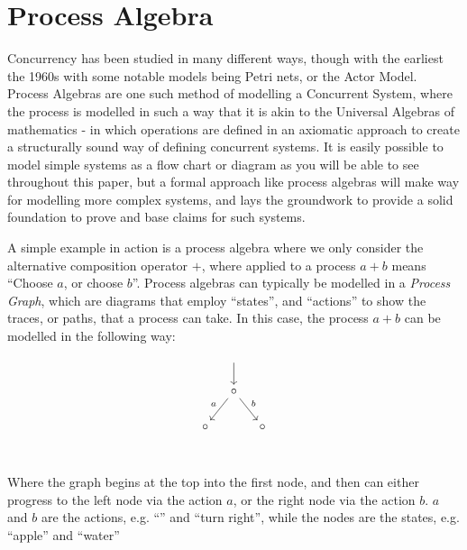 \documentclass[../hons_project.tex]{subfiles}
\begin{document}
\section{Process Algebra}
Concurrency has been studied in many different ways, though with the earliest  the 1960s with some notable models being Petri nets, or the Actor Model. Process Algebras are one such method of modelling a Concurrent System, where the process is modelled in such a way that it is akin to the Universal Algebras of mathematics - in which operations are defined in an axiomatic approach to create a structurally sound way of defining concurrent systems. \citep{baetenBriefHistoryProcess2005} It is easily possible to model simple systems as a flow chart or diagram as you will be able to see throughout this paper, but a formal approach like process algebras will make way for modelling more complex systems, and lays the groundwork to provide a solid foundation to prove and base claims for such systems.

A simple example in action is a process algebra where we only consider the alternative composition operator $+$, where applied to a process $a + b$ means ``Choose $a$, or choose $b$''. Process algebras can typically be modelled in a \textit{Process Graph}, which are diagrams that employ ``states'', and ``actions'' to show the traces, or paths, that a process can take. In this case, the process $a + b$ can be modelled in the following way:

\[\begin{tikzcd}[cramped,column sep=small]
	& {} \\
	& \circ \\
	\circ && \circ \\
	\arrow[from=1-2, to=2-2]
	\arrow["a"', from=2-2, to=3-1]
	\arrow["b", from=2-2, to=3-3]
\end{tikzcd}\]

Where the graph begins at the top into the first node, and then can either progress to the left node via the action $a$, or the right node via the action $b$. $a$ and $b$ are the actions, e.g. ``'' and ``turn right'', while the nodes are the states, e.g. ``apple'' and ``water''
\end{document}
